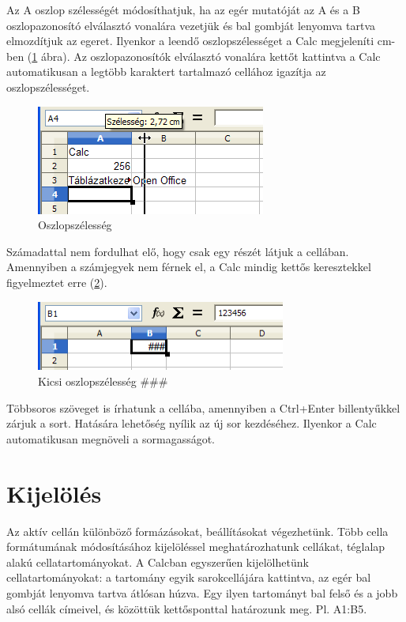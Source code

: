 Az A oszlop szélességét módosíthatjuk, ha az
egér mutatóját az A és a B oszlopazonosító elválasztó
vonalára vezetjük és bal gombját lenyomva tartva elmozdítjuk
az egeret. Ilyenkor a leendő oszlopszélességet a Calc
megjeleníti cm-ben (\ref{Oszlopszélesség} ábra). Az oszlopazonosítók
 elválasztó vonalára kettőt kattintva a Calc automatikusan a
legtöbb karaktert tartalmazó cellához igazítja az
oszlopszélességet.

\begin{figure}[!h]
\begin{center}
\includegraphics[width=7.539cm]{oocalcv2-img7.png}
\caption{Oszlopszélesség}\label{Oszlopszélesség}
\end{center}
\end{figure}

Számadattal nem fordulhat elő, hogy csak egy részét látjuk a
cellában. Amennyiben a számjegyek nem férnek el, a Calc mindig
kettős keresztekkel figyelmeztet erre (\ref{KeskenyOszlop}).

\begin{figure}[!h]
\begin{center}
\includegraphics[width=8.2cm]{oocalcv2-img8.png}
\caption{Kicsi oszlopszélesség \#\#\#}\label{KeskenyOszlop}
\end{center}
\end{figure}

Többsoros szöveget is írhatunk a cellába, amennyiben a
Ctrl+Enter billentyűkkel zárjuk a sort. Hatására
lehetőség nyílik az új sor kezdéséhez. Ilyenkor a Calc
automatikusan megnöveli a sormagasságot.


\section{Kijelölés}

Az aktív cellán különböző formázásokat,
beállításokat végezhetünk. Több cella formátumának
 módosításához kijelöléssel meghatározhatunk cellákat,
téglalap alakú cellatartományokat. A Calcban egyszerűen
kijelölhetünk cellatartományokat: a tartomány egyik
sarokcellájára kattintva, az egér bal gombját lenyomva tartva
átlósan húzva. Egy ilyen tartományt bal felső és a jobb
alsó cellák címeivel, és közöttük kettősponttal
határozunk meg. Pl. A1:B5.

